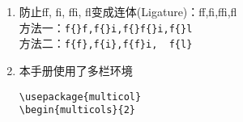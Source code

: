 \documentclass{article}
\begin{document}
\begin{multicols}{2}
\begin{enumerate}
        \item 防止f{}f, f{}i, f{}f{}i, f{}l变成连体(Ligature)：ff,fi,ffi,fl\\
              方法一：\verb|f{}f,f{}i,f{}f{}i,f{}l| \\
              方法二：\verb|f{f},f{i},f{f}i,  f{l}| \\


        \item 本手册使用了多栏环境
              \begin{lstlisting}  
\usepackage{multicol}      
\begin{multicols}{2} 


\end{lstlisting}
\end{enumerate}
\end{multicols}
\end{document}
